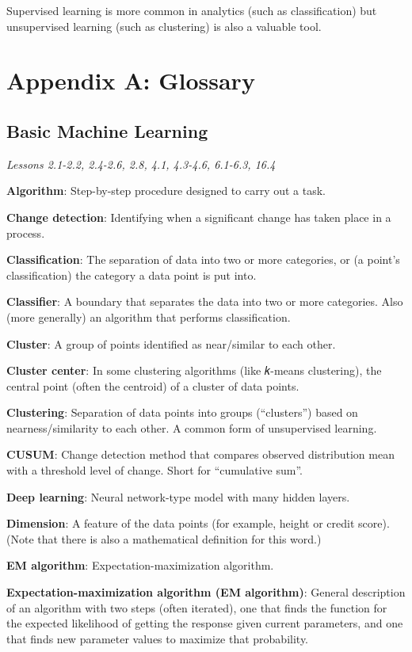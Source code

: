 \documentclass[
]{book}
\begin{document}
Supervised learning is more common in analytics (such as classification) but unsupervised learning (such as clustering) is also a valuable tool.

\chapter{Appendix A: Glossary}\label{appendix-a-glossary}

\section{Basic Machine Learning}\label{basic-machine-learning}

\emph{Lessons 2.1-2.2, 2.4-2.6, 2.8, 4.1, 4.3-4.6, 6.1-6.3, 16.4}

\textbf{Algorithm}: Step-by-step procedure designed to carry out a task.

\textbf{Change detection}: Identifying when a significant change has taken place in a process.

\textbf{Classification}: The separation of data into two or more categories, or (a point's classification) the category a data point is put into.

\textbf{Classifier}: A boundary that separates the data into two or more categories. Also (more generally) an algorithm that performs classification.

\textbf{Cluster}: A group of points identified as near/similar to each other.

\textbf{Cluster center}: In some clustering algorithms (like 𝑘-means clustering), the central point (often the centroid) of a cluster of data points.

\textbf{Clustering}: Separation of data points into groups (``clusters'') based on nearness/similarity to each other. A common form of unsupervised learning.

\textbf{CUSUM}: Change detection method that compares observed distribution mean with a threshold level of change. Short for ``cumulative sum''.

\textbf{Deep learning}: Neural network-type model with many hidden layers.

\textbf{Dimension}: A feature of the data points (for example, height or credit score). (Note that there is also a mathematical definition for this word.)

\textbf{EM algorithm}: Expectation-maximization algorithm.

\textbf{Expectation-maximization algorithm (EM algorithm)}: General description of an algorithm with two steps (often iterated), one that finds the function for the expected likelihood of getting the response given current parameters, and one that finds new parameter values to maximize that probability.
\end{document}
